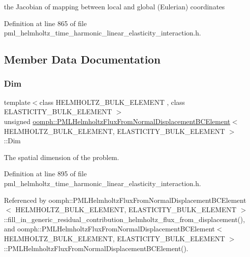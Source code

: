 the Jacobian of mapping between local and global (Eulerian) coordinates 

Definition at line 865 of file pml\+\_\+helmholtz\+\_\+time\+\_\+harmonic\+\_\+linear\+\_\+elasticity\+\_\+interaction.\+h.



\subsection{Member Data Documentation}
\mbox{\label{classoomph_1_1PMLHelmholtzFluxFromNormalDisplacementBCElement_a61904b123c934fd59b5c72f626ebb728}} 
\subsubsection{\texorpdfstring{Dim}{Dim}}
{\footnotesize\ttfamily template$<$class H\+E\+L\+M\+H\+O\+L\+T\+Z\+\_\+\+B\+U\+L\+K\+\_\+\+E\+L\+E\+M\+E\+NT , class E\+L\+A\+S\+T\+I\+C\+I\+T\+Y\+\_\+\+B\+U\+L\+K\+\_\+\+E\+L\+E\+M\+E\+NT $>$ \\
unsigned \hyperlink{classoomph_1_1PMLHelmholtzFluxFromNormalDisplacementBCElement}{oomph\+::\+P\+M\+L\+Helmholtz\+Flux\+From\+Normal\+Displacement\+B\+C\+Element}$<$ H\+E\+L\+M\+H\+O\+L\+T\+Z\+\_\+\+B\+U\+L\+K\+\_\+\+E\+L\+E\+M\+E\+NT, E\+L\+A\+S\+T\+I\+C\+I\+T\+Y\+\_\+\+B\+U\+L\+K\+\_\+\+E\+L\+E\+M\+E\+NT $>$\+::Dim\hspace{0.3cm}{\ttfamily [private]}}



The spatial dimension of the problem. 



Definition at line 895 of file pml\+\_\+helmholtz\+\_\+time\+\_\+harmonic\+\_\+linear\+\_\+elasticity\+\_\+interaction.\+h.



Referenced by oomph\+::\+P\+M\+L\+Helmholtz\+Flux\+From\+Normal\+Displacement\+B\+C\+Element$<$ H\+E\+L\+M\+H\+O\+L\+T\+Z\+\_\+\+B\+U\+L\+K\+\_\+\+E\+L\+E\+M\+E\+N\+T, E\+L\+A\+S\+T\+I\+C\+I\+T\+Y\+\_\+\+B\+U\+L\+K\+\_\+\+E\+L\+E\+M\+E\+N\+T $>$\+::fill\+\_\+in\+\_\+generic\+\_\+residual\+\_\+contribution\+\_\+helmholtz\+\_\+flux\+\_\+from\+\_\+displacement(), and oomph\+::\+P\+M\+L\+Helmholtz\+Flux\+From\+Normal\+Displacement\+B\+C\+Element$<$ H\+E\+L\+M\+H\+O\+L\+T\+Z\+\_\+\+B\+U\+L\+K\+\_\+\+E\+L\+E\+M\+E\+N\+T, E\+L\+A\+S\+T\+I\+C\+I\+T\+Y\+\_\+\+B\+U\+L\+K\+\_\+\+E\+L\+E\+M\+E\+N\+T $>$\+::\+P\+M\+L\+Helmholtz\+Flux\+From\+Normal\+Displacement\+B\+C\+Element().

